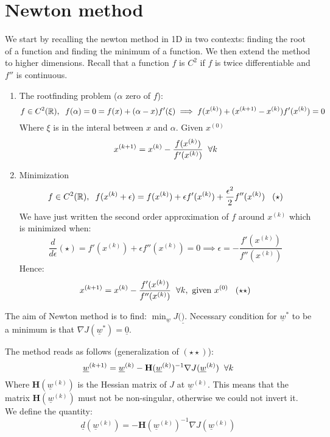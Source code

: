 \section{Newton method}
We start by recalling the newton method in 1D in two contexts: finding the root of a function and finding the minimum of a function. We then extend the method to higher dimensions. Recall that a function $f$ is $C^2$ if $f$ is twice differentiable and $f''$ is continuous.
\begin{enumerate}
    \item The rootfinding problem ($\alpha$ zero of $f$):
    \[
        f \in C^2(\mathbb{R}), \hspace{0.2cm} f(\alpha) = 0 = f(x)  + (\alpha - x)f'(\xi) \implies f(x^{(k)}) + (x^{(k+1)} - x^{(k)})f'(x^{(k)}) = 0    
    \]
    Where $\xi$ is in the interal between $x$ and $\alpha$. Given $x^{(0)}$
    \[
        x^{(k+1)} = x^{(k)} - \frac{f(x^{(k)})}{f'(x^{(k)})} \hspace{0.2cm} \forall k
    \]
    \item Minimization
    \[
        f \in C^2(\mathbb{R}), \hspace{0.2cm} f(x^{(k)} + \epsilon) = f(x^{(k)}) + \epsilon f'(x^{(k)}) + \frac{\epsilon^2}{2}f''(x^{(k)}) \hspace{0.3cm} (\star)
    \]
    We have just written the second order approximation of $f$ around $x^{(k)}$ which is minimized when:
    \[
        \dfrac{d}{d\epsilon}(\star) = f'(x^{(k)}) + \epsilon f''(x^{(k)}) = 0 \implies \epsilon = -\frac{f'(x^{(k)})}{f''(x^{(k)})}
    \]
    Hence:
    \[
        x^{(k+1)} = x^{(k)} - \frac{f'(x^{(k)})}{f''(x^{(k)})} \hspace{0.2cm} \forall k, \text{ given } x^{(0)} \hspace{0.3cm} (\star\star)    
    \]
\end{enumerate}

The aim of Newton method is to find: $\min_{\underline{w}} J(\underline)$. Necessary condition for $\underline{w}^*$ to be a minimum is that $\nabla J(\underline{w}^*) = \underline{0}$. 

The method reads as follows (generalization of $(\star\star)$):
\[
    \underline{w}^{(k+1)} = \underline{w}^{(k)} - \mathbf{H} (\underline{w}^{(k)})^{-1}\nabla J(\underline{w}^{(k)}) \hspace{0.2cm} \forall k
\]
Where $\mathbf{H} (\underline{w}^{(k)})$ is the Hessian matrix of $J$ at $\underline{w}^{(k)}$. This means that the matrix $\mathbf{H} (\underline{w}^{(k)})$ must not be non-singular, otherwise we could not invert it. We define the quantity:
\[
    \underline{d}(\underline{w}^{(k)}) = - \mathbf{H} (\underline{w}^{(k)})^{-1}\nabla J(\underline{w}^{(k)})
\]

